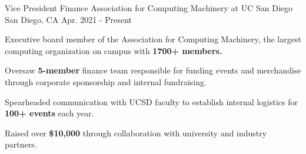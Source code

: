 
\begin{cventries}

\cventry
{Vice President Finance} %
{Association for Computing Machinery at UC San Diego} %
{San Diego, CA} %
{Apr. 2021 - Present} %
{
  \begin{cvitems} %
    \item {Executive board member of the Association for Computing Machinery, the largest computing organization on campus with \textbf{1700+ members.}}
    \item {Oversaw \textbf{5-member} finance team responsible for funding events and merchandise through corporate sponsorship and internal fundraising. }
    \item {Spearheaded communication with UCSD faculty to establish internal logistics for \textbf{100+ events} each year. }
    \item {Raised over \textbf{\$10,000} through collaboration with university and industry partners.}
  \end{cvitems}
}

\end{cventries}
